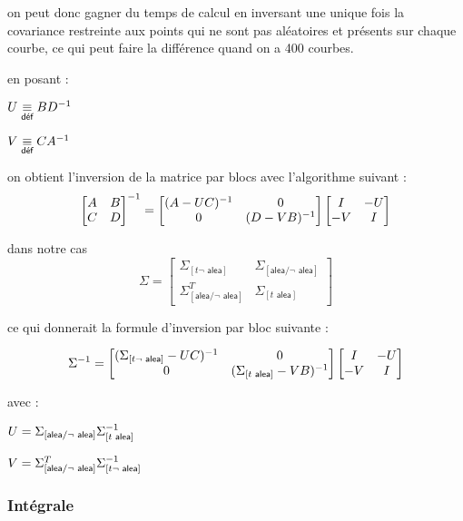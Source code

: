 on peut donc gagner du temps de calcul en inversant une unique fois la covariance restreinte aux points qui ne sont pas aléatoires et présents sur chaque courbe, ce qui peut faire la différence quand on a 400 courbes.

en posant : 

$U \isdef B \inverse D$

$V \isdef C \inverse A$


on obtient l'inversion de la matrice par blocs avec l'algorithme suivant :
$$
\begin{bmatrix}
A & B \\
C & D
\end{bmatrix}^{-1}
=
\begin{bmatrix}
\inverse{(A - UC)} & 0 \\
0 & \inverse{(D - VB)}
\end{bmatrix}
\begin{bmatrix}
I & - U \\
- V & I
\end{bmatrix}
$$

dans notre cas 
$$\Sigma = \begin{bmatrix}
    \Sigma_{[t \neg\textsf{ alea}]} & \Sigma_{[\textsf{alea} / \neg \textsf{ alea}]}
    \\ \Sigma^T_{[\textsf{alea} / \neg \textsf{ alea}]}
     & \Sigma_{[t \textsf{ alea}]} 
\end{bmatrix}$$

ce qui donnerait la formule d'inversion par bloc suivante :

$$
\inverse \Sigma
=
\begin{bmatrix}
    \inverse{(\Sigma_{[t \neg\textsf{ alea}]} - UC)} & 0 \\
    0 & \inverse{(\Sigma_{[t \textsf{ alea}]} - VB)}
    \end{bmatrix}
    \begin{bmatrix}
    I & - U \\
    - V & I
    \end{bmatrix}
$$

avec : 

$U = \Sigma_{[\textsf{alea} / \neg \textsf{ alea}]} \inverse {\Sigma_{[t \textsf{ alea}]}} $

$V = \Sigma^T_{[\textsf{alea} / \neg \textsf{ alea}]} \inverse {\Sigma_{[t \neg\textsf{ alea}]}}$

\subsubsection{Intégrale}

